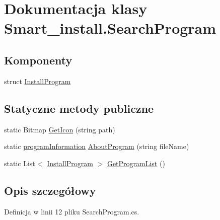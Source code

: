 \hypertarget{class_smart__install_1_1_search_program}{\section{Dokumentacja klasy Smart\+\_\+install.\+Search\+Program}
\label{class_smart__install_1_1_search_program}
}
\subsection*{Komponenty}
\begin{DoxyCompactItemize}
\item 
struct \hyperlink{struct_smart__install_1_1_search_program_1_1_install_program}{Install\+Program}
\end{DoxyCompactItemize}
\subsection*{Statyczne metody publiczne}
\begin{DoxyCompactItemize}
\item 
static Bitmap \hyperlink{class_smart__install_1_1_search_program_a6619a63068a1f19298d72bd2592dc6af}{Get\+Icon} (string path)
\item 
static \hyperlink{class_smart__install_1_1program_information}{program\+Information} \hyperlink{class_smart__install_1_1_search_program_a094deb27526adc472a113862b4967658}{About\+Program} (string file\+Name)
\item 
static List$<$ \hyperlink{struct_smart__install_1_1_search_program_1_1_install_program}{Install\+Program} $>$ \hyperlink{class_smart__install_1_1_search_program_ae939a9cee38c376f978c0f4ff1cf36ac}{Get\+Program\+List} ()
\end{DoxyCompactItemize}


\subsection{Opis szczegółowy}


Definicja w linii 12 pliku Search\+Program.\+cs.



